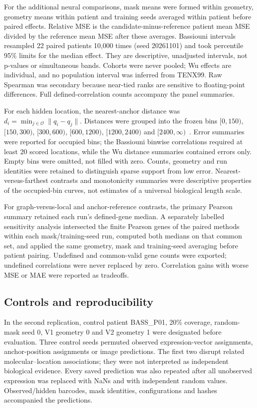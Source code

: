 For the additional neural comparisons, mask means were formed within geometry, geometry means within patient and training seeds averaged within patient before paired effects. Relative MSE is the candidate-minus-reference patient mean MSE divided by the reference mean MSE after these averages. Bassiouni intervals resampled 22 paired patients 10,000 times (seed 20261101) and took percentile 95\% limits for the median effect. They are descriptive, unadjusted intervals, not p-values or simultaneous bands. Cohorts were never pooled; Wu effects are individual, and no population interval was inferred from TENX99. Raw Spearman was secondary because near-tied ranks are sensitive to floating-point differences. Full defined-correlation counts accompany the panel summaries.

For each hidden location, the nearest-anchor distance was $d_i=\min_{j\in\mathcal O}\|q_i-q_j\|$. Distances were grouped into the frozen bins $[0,150)$, $[150,300)$, $[300,600)$, $[600,1200)$, $[1200,2400)$ and $[2400,\infty)$~\um{}. Error summaries were reported for occupied bins; the Bassiouni binwise correlations required at least 20 scored locations, while the Wu distance summaries contained errors only. Empty bins were omitted, not filled with zero. Counts, geometry and run identities were retained to distinguish sparse support from low error. Nearest-versus-farthest contrasts and monotonicity summaries were descriptive properties of the occupied-bin curves, not estimates of a universal biological length scale.

For graph-versus-local and anchor-reference contrasts, the primary Pearson summary retained each run's defined-gene median. A separately labelled sensitivity analysis intersected the finite Pearson genes of the paired methods within each mask/training-seed run, computed both medians on that common set, and applied the same geometry, mask and training-seed averaging before patient pairing. Undefined and common-valid gene counts were exported; undefined correlations were never replaced by zero. Correlation gains with worse MSE or MAE were reported as tradeoffs.

\subsection{Controls and reproducibility}
In the second replication, control patient BASS\_P01, 20\% coverage, random-mask seed 0, V1 geometry 0 and V2 geometry 1 were designated before evaluation. Three control seeds permuted observed expression-vector assignments, anchor-position assignments or image predictions. The first two disrupt related molecular--location associations; they were not interpreted as independent biological evidence. Every saved prediction was also repeated after all unobserved expression was replaced with NaNs and with independent random values. Observed/hidden barcodes, mask identities, configurations and hashes accompanied the predictions.


